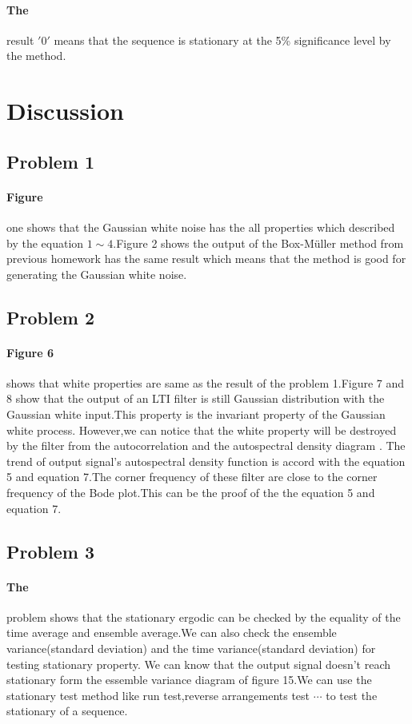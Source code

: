 \documentclass[12pt,a4paper]{article}
\begin{document}
			\paragraph{The} result $'0'$ means that the sequence is stationary at the 5\% significance level by the method.
	\section{Discussion}
		\subsection{Problem 1}
			\paragraph{Figure}one shows that the Gaussian white noise has the all properties which described by the equation $1\sim4.$Figure 2 shows the output of the Box-M\"{u}ller method from previous homework has the same result which means that the method is good for generating the Gaussian white noise.
		\subsection{Problem 2}
			\paragraph{Figure 6}shows that white properties are same as the result of the problem 1.Figure 7 and 8 show that the output of an LTI filter is still Gaussian distribution with the Gaussian white input.This property is the invariant property of the Gaussian white process.  However,we can notice that the white property will be destroyed by the filter from the autocorrelation and the autospectral density diagram . The trend of output signal's autospectral density function is accord with the equation 5 and equation 7.The corner frequency of these filter are close to the corner frequency of the Bode plot.This can be the proof of the the equation 5 and equation 7.
		\subsection{Problem 3}
		\paragraph{The} problem shows that the stationary ergodic can be checked by the equality of the time average and ensemble average.We can also check the ensemble variance(standard deviation) and the time variance(standard deviation) for testing stationary property. We can know that the output signal doesn't reach stationary form the essemble variance diagram of figure 15.We can use the stationary test method like run test,reverse arrangements test $\cdots$ to test the stationary of a sequence.
\end{document}
